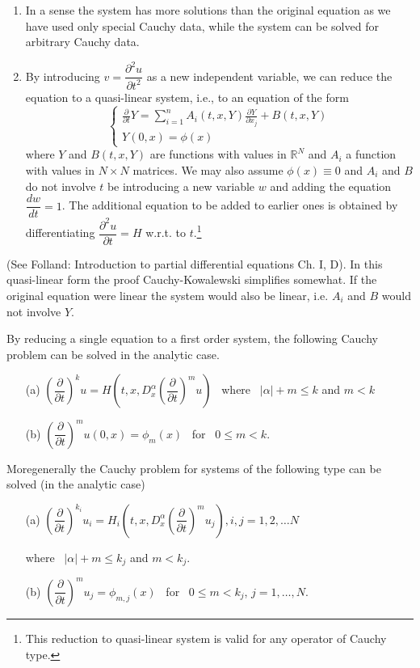 \begin{remarks*}
\begin{enumerate}
\item In a sense the system has more solutions than the original equation as we have used only special Cauchy data, while the system can be solved for arbitrary Cauchy data.

\item By introducing $v=\dfrac{\partial^{2}u}{\partial t^{2}}$ as a new independent variable, we can reduce the equation to a quasi-linear system, i.e., to an equation of the form
$$
\begin{cases}
\frac{\partial}{\partial t}Y=\sum^{n}_{i=1}A_{i}(t,x,Y)\frac{\partial Y}{\partial x_{j}}+B(t,x,Y)\\[4pt]
Y(0,x)=\phi(x)
\end{cases}
$$
where $Y$ and $B(t,x,Y)$ are functions with values in $\mathbb{R}^{N}$ and $A_{i}$ a function with values in $N\times N$ matrices. We may also assume $\phi(x)\equiv 0$ and $A_{i}$ and $B$ do not involve $t$ be introducing a new variable $w$ and adding the equation $\dfrac{dw}{dt}=1$. The additional equation to be added to earlier ones is obtained by differentiating $\dfrac{\partial^{2}u}{\partial t}=H$ w.r.t. to $t$.\footnote[1]{This reduction to quasi-linear system is valid for any operator of Cauchy type.}
\end{enumerate}
(See Folland: Introduction to partial differential equations Ch. I, D). In this quasi-linear form the proof Cauchy-Kowalewski simplifies somewhat. If the original equation were linear the system would also be linear, i.e. $A_{i}$ and $B$ would not involve $Y$.

By reducing a single equation to a first order system, the following Cauchy problem can be solved in the analytic case.
\begin{itemize}
\item[(a)] $\left(\dfrac{\partial}{\partial t}\right)^{k}u=H\left(t,x,D^{\alpha}_{x}\left(\dfrac{\partial}{\partial t}\right)^{m}u\right)$ \ where \ $|\alpha | + m\leq k$ and $m<k$

\item[(b)] $\left(\dfrac{\partial}{\partial t}\right)^{m}u(0,x)=\phi_{m}(x)$ \ for \ $0\leq m<k$.
\end{itemize}
More\pageoriginale generally the Cauchy problem for systems of the following type can be solved (in the analytic case)
\begin{itemize}
\item[(a)] $\left(\dfrac{\partial}{\partial t}\right)^{k_{i}}u_{i}=H_{i}\left(t,x,D^{\alpha}_{x}\left(\dfrac{\partial}{\partial t}\right)^{m}u_{j}\right), i, j=1,2,\ldots N$

where \ $|\alpha|+m\leq k_{j}$ and $m<k_{j}$.

\item[(b)] $\left(\dfrac{\partial}{\partial t}\right)^{m}u_{j}=\phi_{m,j}(x)$  \ for \ $0\leq m<k_{j}$, $j=1,\ldots,N$.
\end{itemize}
\end{remarks*}

